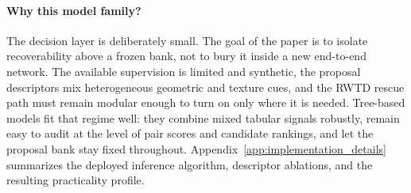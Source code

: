 \paragraph{Why this model family?} The decision layer is deliberately small. The goal of the paper is to isolate recoverability above a frozen bank, not to bury it inside a new end-to-end network. The available supervision is limited and synthetic, the proposal descriptors mix heterogeneous geometric and texture cues, and the RWTD rescue path must remain modular enough to turn on only where it is needed. Tree-based models fit that regime well: they combine mixed tabular signals robustly, remain easy to audit at the level of pair scores and candidate rankings, and let the proposal bank stay fixed throughout. Appendix~\ref{app:implementation_details} summarizes the deployed inference algorithm, descriptor ablations, and the resulting practicality profile.
